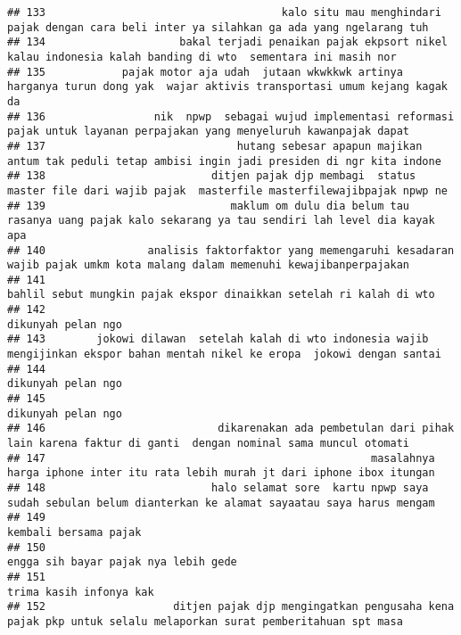 \documentclass[
]{article}
\begin{document}
\begin{verbatim}
## 133                                     kalo situ mau menghindari pajak dengan cara beli inter ya silahkan ga ada yang ngelarang tuh
## 134                     bakal terjadi penaikan pajak ekpsort nikel    kalau indonesia kalah banding di wto  sementara ini masih nor 
## 135            pajak motor aja udah  jutaan wkwkkwk artinya harganya turun dong yak  wajar aktivis transportasi umum kejang kagak da
## 136                 nik  npwp  sebagai wujud implementasi reformasi pajak untuk layanan perpajakan yang menyeluruh kawanpajak dapat 
## 137                              hutang sebesar apapun majikan antum tak peduli tetap ambisi ingin jadi presiden di ngr kita indone 
## 138                          ditjen pajak djp membagi  status master file dari wajib pajak  masterfile masterfilewajibpajak npwp ne 
## 139                             maklum om dulu dia belum tau rasanya uang pajak kalo sekarang ya tau sendiri lah level dia kayak apa
## 140                analisis faktorfaktor yang memengaruhi kesadaran wajib pajak umkm kota malang dalam memenuhi kewajibanperpajakan 
## 141                                                             bahlil sebut mungkin pajak ekspor dinaikkan setelah ri kalah di wto 
## 142                                                                                                         dikunyah pelan ngo      
## 143        jokowi dilawan  setelah kalah di wto indonesia wajib mengijinkan ekspor bahan mentah nikel ke eropa  jokowi dengan santai
## 144                                                                                                         dikunyah pelan ngo      
## 145                                                                                                         dikunyah pelan ngo      
## 146                           dikarenakan ada pembetulan dari pihak lain karena faktur di ganti  dengan nominal sama muncul otomati 
## 147                                                   masalahnya harga iphone inter itu rata lebih murah jt dari iphone ibox itungan
## 148                          halo selamat sore  kartu npwp saya sudah sebulan belum dianterkan ke alamat sayaatau saya harus mengam 
## 149                                                                                                           kembali bersama pajak 
## 150                                                                                             engga sih bayar pajak nya lebih gede
## 151                                                                                                          trima kasih infonya kak
## 152                    ditjen pajak djp mengingatkan pengusaha kena pajak pkp untuk selalu melaporkan surat pemberitahuan spt masa  

\end{verbatim}
\end{document}
